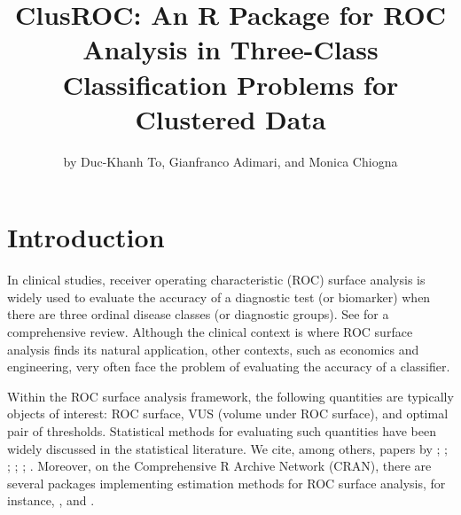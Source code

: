 \title{ClusROC: An R Package for ROC Analysis in Three-Class Classification Problems for Clustered Data}
\author{by Duc-Khanh To, Gianfranco Adimari, and Monica Chiogna}

\maketitle


\hypertarget{introduction}{%
\section{Introduction}\label{introduction}}

In clinical studies, receiver operating characteristic (ROC) surface analysis is widely used to evaluate the accuracy of a diagnostic test (or biomarker) when there are three ordinal disease classes (or diagnostic groups). See \citet{nak:14} for a comprehensive review. Although the clinical context is where ROC surface analysis finds its natural application, other contexts,  such as economics and engineering, very often face the problem of evaluating the accuracy of a classifier.

Within the ROC surface analysis framework, the following quantities are typically objects of interest: ROC surface, VUS (volume under ROC surface), and optimal pair of thresholds. Statistical methods for evaluating such quantities have been widely discussed in the statistical literature. We cite, among others, papers by \citet{nak:04}; \citet{xiong2006measuring}; \citet{nakas2010accuracy}; \citet{attwood2014diagnostic}; \citet{bantis2017construction}; \citet{toduc2016mar}. Moreover, on the Comprehensive R Archive Network (CRAN), there are several packages implementing estimation methods for ROC surface analysis, for instance,  \citep{trinROC},  \citep{ThresholdROC} and  \citep{bcROCsurface}.


